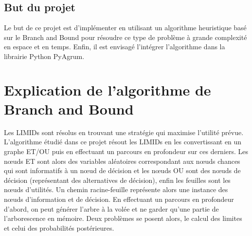 \documentclass[12pt]{article}
\begin{document}
\subsection{But du projet}
Le but de ce projet est d'implémenter en utilisant un algorithme heuristique basé sur le Branch and Bound pour résoudre ce type de problème à grande complexité en espace et en temps. Enfin, il est envisagé l'intégrer l'algorithme dans la librairie Python PyAgrum.

\section{Explication de l'algorithme de Branch and Bound}
Les LIMIDs sont résolus en trouvant une stratégie qui maximise l'utilité prévue.
L'algorithme étudié dans ce projet résout les LIMIDs en les convertissant en un graphe ET/OU puis en effectuant un parcours en profondeur sur ces derniers.
Les nœuds ET sont alors des variables aléatoires correspondant aux nœuds chances qui sont informatifs à un nœud de décision et les nœuds OU sont des nœuds de décision (représentant des alternatives de décision), enfin les feuilles sont les nœuds d'utilités.
Un chemin racine-feuille représente alors une instance des nœuds d'information et de décision.
En effectuant un parcours en profondeur d'abord, on peut générer l'arbre à la volée et ne garder qu'une partie de l'arborescence en mémoire.
Deux problèmes se posent alors, le calcul des limites et celui des probabilités postérieures.
\end{document}
